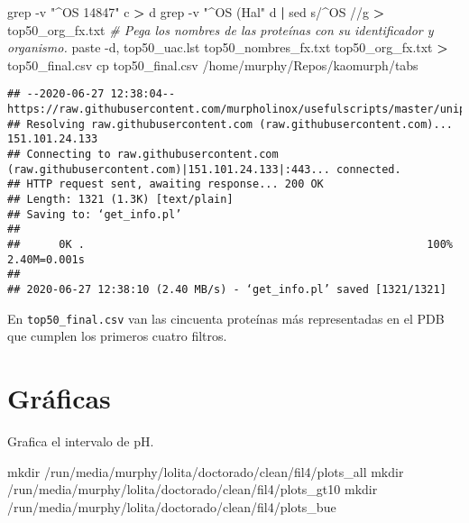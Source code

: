 \documentclass[
]{book}
\newenvironment{Shaded}{\begin{snugshade}}{\end{snugshade}}
\newcommand{\CommentTok}[1]{\textcolor[rgb]{0.56,0.35,0.01}{\textit{#1}}}
\newcommand{\ExtensionTok}[1]{#1}
\newcommand{\FunctionTok}[1]{\textcolor[rgb]{0.00,0.00,0.00}{#1}}
\newcommand{\KeywordTok}[1]{\textcolor[rgb]{0.13,0.29,0.53}{\textbf{#1}}}
\newcommand{\NormalTok}[1]{#1}
\newcommand{\OperatorTok}[1]{\textcolor[rgb]{0.81,0.36,0.00}{\textbf{#1}}}
\newcommand{\StringTok}[1]{\textcolor[rgb]{0.31,0.60,0.02}{#1}}
\begin{document}
\begin{Shaded}
\begin{Highlighting}[]
\FunctionTok{grep}\NormalTok{ {-}v }\StringTok{"\^{}OS   14847"}\NormalTok{  c }\OperatorTok{\textgreater{}}\NormalTok{ d}
\FunctionTok{grep}\NormalTok{ {-}v }\StringTok{"\^{}OS   (Hal"}\NormalTok{ d }\KeywordTok{|} \FunctionTok{sed} \StringTok{\textquotesingle{}s/\^{}OS   //g\textquotesingle{}} \OperatorTok{\textgreater{}}\NormalTok{ top50\_org\_fx.txt }
\CommentTok{\# Pega los nombres de las proteínas con su identificador y organismo.}
\ExtensionTok{paste}\NormalTok{ {-}d, top50\_uac.lst top50\_nombres\_fx.txt top50\_org\_fx.txt }\OperatorTok{\textgreater{}}\NormalTok{ top50\_final.csv}
\FunctionTok{cp}\NormalTok{ top50\_final.csv /home/murphy/Repos/kaomurph/tabs}
\end{Highlighting}
\end{Shaded}

\begin{verbatim}
## --2020-06-27 12:38:04--  https://raw.githubusercontent.com/murpholinox/usefulscripts/master/uniprot_batch_retrieval.pl
## Resolving raw.githubusercontent.com (raw.githubusercontent.com)... 151.101.24.133
## Connecting to raw.githubusercontent.com (raw.githubusercontent.com)|151.101.24.133|:443... connected.
## HTTP request sent, awaiting response... 200 OK
## Length: 1321 (1.3K) [text/plain]
## Saving to: ‘get_info.pl’
## 
##      0K .                                                     100% 2.40M=0.001s
## 
## 2020-06-27 12:38:10 (2.40 MB/s) - ‘get_info.pl’ saved [1321/1321]
\end{verbatim}

En \texttt{top50\_final.csv} van las cincuenta proteínas más representadas en el PDB que cumplen los primeros cuatro filtros.

\hypertarget{gruxe1ficas}{%
\section{Gráficas}\label{gruxe1ficas}}

Grafica el intervalo de pH.

\begin{Shaded}
\begin{Highlighting}[]
\FunctionTok{mkdir}\NormalTok{ /run/media/murphy/lolita/doctorado/clean/fil4/plots\_all}
\FunctionTok{mkdir}\NormalTok{ /run/media/murphy/lolita/doctorado/clean/fil4/plots\_gt10}
\FunctionTok{mkdir}\NormalTok{ /run/media/murphy/lolita/doctorado/clean/fil4/plots\_bue}
\end{Highlighting}
\end{Shaded}
\end{document}
